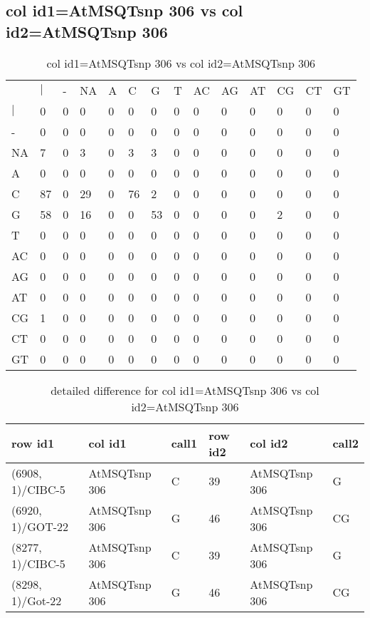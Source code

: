 \subsection{col id1=AtMSQTsnp 306 vs col id2=AtMSQTsnp 306}
\begin{center}
\begin{longtable}{|l|l|l|l|l|l|l|l|l|l|l|l|l|l|}
\caption{col id1=AtMSQTsnp 306 vs col id2=AtMSQTsnp 306} \label{table_dm838}\\
\hline
\\
\hline
&$|$&-&NA&A&C&G&T&AC&AG&AT&CG&CT&GT\\
$|$&0&0&0&0&0&0&0&0&0&0&0&0&0\\
-&0&0&0&0&0&0&0&0&0&0&0&0&0\\
NA&7&0&3&0&3&3&0&0&0&0&0&0&0\\
A&0&0&0&0&0&0&0&0&0&0&0&0&0\\
C&87&0&29&0&76&2&0&0&0&0&0&0&0\\
G&58&0&16&0&0&53&0&0&0&0&2&0&0\\
T&0&0&0&0&0&0&0&0&0&0&0&0&0\\
AC&0&0&0&0&0&0&0&0&0&0&0&0&0\\
AG&0&0&0&0&0&0&0&0&0&0&0&0&0\\
AT&0&0&0&0&0&0&0&0&0&0&0&0&0\\
CG&1&0&0&0&0&0&0&0&0&0&0&0&0\\
CT&0&0&0&0&0&0&0&0&0&0&0&0&0\\
GT&0&0&0&0&0&0&0&0&0&0&0&0&0\\
\hline
\end{longtable}
\end{center}

\begin{center}
\begin{longtable}{|l|l|l|l|l|l|}
\caption{detailed difference for col id1=AtMSQTsnp 306 vs col id2=AtMSQTsnp 306} \label{table_dm839}\\
\hline
row id1&col id1&call1&row id2&col id2&call2\\
\hline
(6908, 1)/CIBC-5&AtMSQTsnp 306&C&39&AtMSQTsnp 306&G\\
(6920, 1)/GOT-22&AtMSQTsnp 306&G&46&AtMSQTsnp 306&CG\\
(8277, 1)/CIBC-5&AtMSQTsnp 306&C&39&AtMSQTsnp 306&G\\
(8298, 1)/Got-22&AtMSQTsnp 306&G&46&AtMSQTsnp 306&CG\\
\hline
\end{longtable}
\end{center}

